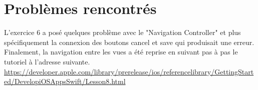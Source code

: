 \section{Problèmes rencontrés}
L'exercice 6 a posé quelques problème avec le "Navigation Controller" et plus spécifiquement la connexion des boutons cancel et save qui produisait une erreur.\\
Finalement, la navigation entre les vues a été reprise en suivant pas à pas le tutoriel à l'adresse suivante.\\
\url{https://developer.apple.com/library/prerelease/ios/referencelibrary/GettingStarted/DevelopiOSAppsSwift/Lesson8.html}